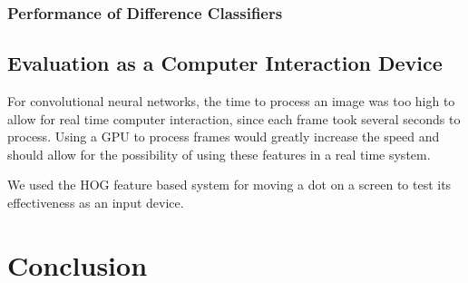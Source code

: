 \documentclass[10pt,twocolumn,letterpaper]{article}
\begin{document}
\subsubsection{Performance of Difference Classifiers}

\subsection{Evaluation as a Computer Interaction Device}

For convolutional neural networks, the time to process an image was too high to allow for real time computer interaction, since each frame took several seconds to process.  Using a GPU to process frames would greatly increase the speed and should allow for the possibility of using these features in a real time system.

We used the HOG feature based system for moving a dot on a screen to test its effectiveness as an input device.

\section{Conclusion}


{\small


}
\end{document}
